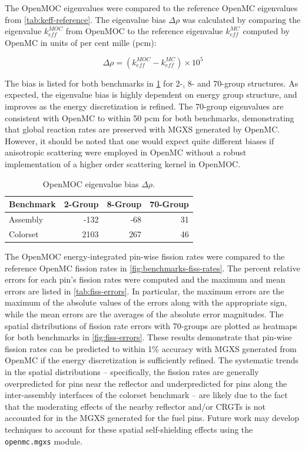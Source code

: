 The OpenMOC eigenvalues were compared to the reference OpenMC eigenvalues from \cref{tab:keff-reference}. The eigenvalue bias $\Delta\rho$ was calculated by comparing the eigenvalue $k_{eff}^{MOC}$ from OpenMOC to the reference eigenvalue $k_{eff}^{MC}$ computed by OpenMC in units of per cent mille (pcm):

\begin{equation}
\label{eqn:delta-rho}
\Delta\rho = \left(k_{eff}^{MOC} - k_{eff}^{MC}\right) \times 10^{5}
\end{equation}

The bias is listed for both benchmarks in \cref{tab:keff-bias} for 2-, 8- and 70-group structures. As expected, the eigenvalue bias is highly dependent on energy group structure, and improves as the energy discretization is refined. The 70-group eigenvalues are consistent with OpenMC to within 50 pcm for both benchmarks, demonstrating that global reaction rates are preserved with MGXS generated by OpenMC. However, it should be noted that one would expect quite different biases if anisotropic scattering were employed in OpenMC without a robust implementation of a higher order scattering kernel in OpenMOC.

\begin{table}[h!]
  \centering
  \caption{OpenMOC eigenvalue bias $\Delta\rho$.}
  \label{tab:keff-bias}
  \begin{tabular}{l r r r}
  \toprule
  \textbf{Benchmark} & \textbf{2-Group} & \textbf{8-Group} & \textbf{70-Group} \\
  \midrule
  Assembly & -132 & -68 & 31 \\
  \midrule
  Colorset & 2103 & 267 & 46 \\
  \bottomrule
\end{tabular}
\end{table}

The OpenMOC energy-integrated pin-wise fission rates were compared to the reference OpenMC fission rates in \cref{fig:benchmarks-fiss-rates}. The percent relative errors for each pin's fission rates were computed and the maximum and mean errors are listed in \cref{tab:fiss-errors}. In particular, the maximum errors are the maximum of the absolute values of the errors along with the appropriate sign, while the mean errors are the averages of the absolute error magnitudes. The spatial distributions of fission rate errors with 70-groups are plotted as heatmaps for both benchmarks in \cref{fig:fiss-errors}. These results demonstrate that pin-wise fission rates can be predicted to within 1\% accuracy with MGXS generated from OpenMC if the energy discretization is sufficiently refined. The systematic trends in the spatial distributions -- specifically, the fission rates are generally overpredicted for pins near the reflector and underpredicted for pins along the inter-assembly interfaces of the colorset benchmark -- are likely due to the fact that the moderating effects of the nearby reflector and/or CRGTs is not accounted for in the MGXS generated for the fuel pins. Future work may develop techniques to account for these spatial self-shielding effects using the \texttt{openmc.mgxs} module.

